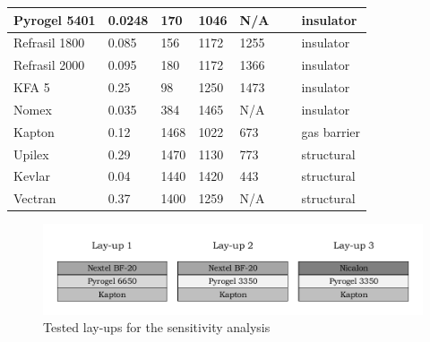 \begin{table}[ht]
\begin{tabular}{|l|l|l|l|l|l|l|}
		Pyrogel 5401      & 0.0248                                                & 170                                        & 1046                                            & N/A  	 & ~          & insulator                                 \\ \hline
		Refrasil 1800      & 0.085                                                 & 156                                        & 1172                                            & 1255 	 & ~           & insulator                                \\ \hline
		Refrasil 2000      & 0.095                                                 & 180                                        & 1172                                            & 1366 	 & ~            & insulator                               \\ \hline
		KFA 5             & 0.25                                                  & 98                                         & 1250                                            & 1473 	 & ~        & insulator                                   \\ \hline
		Nomex             & 0.035                                                  & 384                                         & 1465                                            & N/A 	 & ~        & insulator                                   \\ \hline
		Kapton            & 0.12                                                  & 1468                                       & 1022                                            & 673	 & ~            & gas barrier                              \\ \hline
		Upilex            & 0.29                                                  & 1470                                       & 1130                                            & 773 	 & ~             & structural                            \\ \hline
		Kevlar            & 0.04 & 1440                                       & 1420                                            & 443 	 & ~             & structural                            \\ \hline
		Vectran            & 0.37 & 1400 & 1259 & N/A 	 &  & structural                            \\ \hline
	\end{tabular}
	\label{tab:tpsmatprop}
\end{table}

\begin{figure}[h]
	\centering
	\includegraphics{./Figure/Thermal/layersensthermal.pdf}
	\caption{Tested lay-ups for the sensitivity analysis}
	\label{fig:layersensthermal}
\end{figure}


